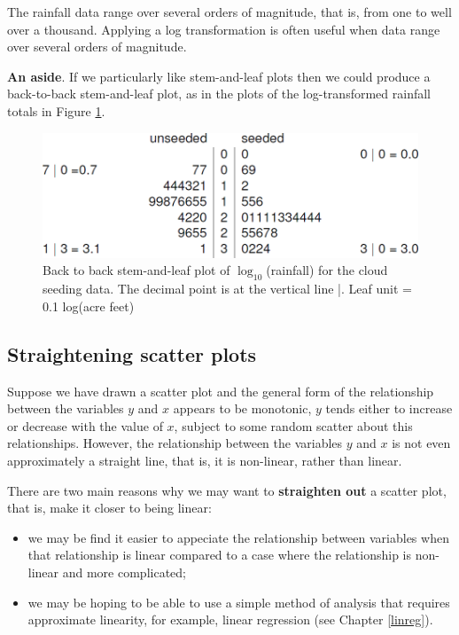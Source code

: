 \documentclass[
  11pt,
  british,
  openany, a4paper]{book}
\providecommand{\tightlist}{%
  \setlength{\itemsep}{0pt}\setlength{\parskip}{0pt}}
\begin{document}
The rainfall data range over several orders of magnitude, that is, from one to well over a thousand. Applying a log transformation is often useful when data range over several orders of magnitude.

\textbf{An aside}. If we particularly like stem-and-leaf plots then we could produce a back-to-back stem-and-leaf plot, as in the plots of the log-transformed rainfall totals in Figure \ref{fig:cloudstem}.

\begin{figure}

{\centering \includegraphics[width=0.75\linewidth]{images/cloud_stem} 

}

\caption{Back to back stem-and-leaf plot of $\log_{10}$(rainfall) for the cloud seeding data. The decimal point is at the vertical line |. Leaf unit = 0.1 log(acre feet)}\label{fig:cloudstem}
\end{figure}

\hypertarget{straighten}{%
\subsection{Straightening scatter plots}\label{straighten}}

Suppose we have drawn a scatter plot and the general form of the relationship between the variables \(y\) and \(x\) appears to be monotonic, \(y\) tends either to increase or decrease with the value of \(x\), subject to some random scatter about this relationships. However, the relationship between the variables \(y\) and \(x\) is not even approximately a straight line, that is, it is non-linear, rather than linear.

There are two main reasons why we may want to \textbf{straighten out} a scatter plot, that is, make it closer to being linear:

\begin{itemize}
\tightlist
\item
  we may be find it easier to appeciate the relationship between variables when that relationship is linear compared to a case where the relationship is non-linear and more complicated;
\item
  we may be hoping to be able to use a simple method of analysis that requires approximate linearity, for example, linear regression (see Chapter \ref{linreg}).
\end{itemize}
\end{document}
